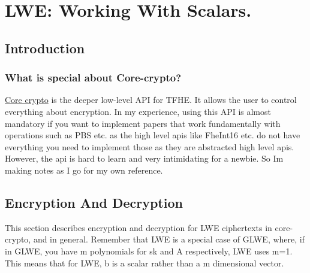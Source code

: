 \documentclass{report}
\begin{document}
\chapter{LWE: Working With Scalars.}

\section{Introduction}
\subsection{What is special about Core-crypto?}
\href{https://docs.zama.org/tfhe-rs/references/core-crypto-api/tutorial}{Core crypto} is the deeper low-level API for TFHE. It allows the user to control everything about encryption. In my experience, using this API is almost mandatory if you want to implement papers that work fundamentally with operations such as PBS etc. as the high level apis like FheInt16 etc. do not have everything you need to implement those as they are abstracted high level apis. \newline
However, the api is hard to learn and very intimidating for a newbie. So Im making notes as I go for my own reference.

\section{Encryption And Decryption}
This section describes encryption and decryption for LWE ciphertexts in core-crypto, and in general. Remember that LWE is a special case of GLWE, where, if in GLWE, you have m polynomials for sk and A respectively, LWE uses m=1. This means that for LWE, b is a scalar rather than a m dimensional vector.
\end{document}
